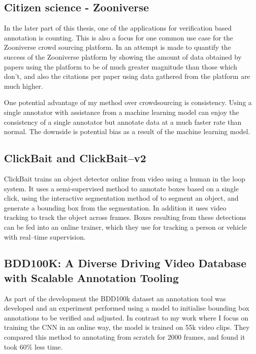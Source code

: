 \subsection{Citizen science - Zooniverse \cite{Zooniverse}}

In the later part of this thesis, one of the applications for verification based annotation is counting. This is also a focus for one common use case for the Zooniverse crowd sourcing platform. In \cite{Watson2018} an attempt is made to quantify the success of the Zooniverse platform by showing the amount of data obtained by papers using the platform to be of much greater magnitude than those which don't, and also the citations per paper using data gathered from the platform are much higher. 

One potential advantage of my method over crowdsourcing is consistency. Using a single annotator with assistance from a machine learning model can enjoy the consistency of a single annotator but annotate data at a much faster rate than normal. The downside is potential bias as a result of the machine learning model.

\subsection{ClickBait and ClickBait--v2 \cite{Teng2017, Teng2018}}

ClickBait trains an object detector online from video using a human in the loop system. It uses a semi-supervised method to annotate boxes based on a single click, using the interactive segmentation method of \cite{Xu2016} to segment an object, and generate a bounding box from the segmentation. In addition it uses video tracking to track the object across frames. Boxes resulting from these detections can be fed into an online trainer, which they use for tracking a person or vehicle with real--time supervision.


\subsection{BDD100K: A Diverse Driving Video Database with
Scalable Annotation Tooling \cite{Yu2018a}}

As part of the development the BDD100k dataset an annotation tool was developed and an experiment performed using a model to initialise bounding box annotations to be verified and adjusted. In contrast to my work where I focus on training the \gls{CNN} in an online way, the model is trained on 55k video clips. They compared this method to annotating from scratch for 2000 frames, and found it took $60\%$ less time.

